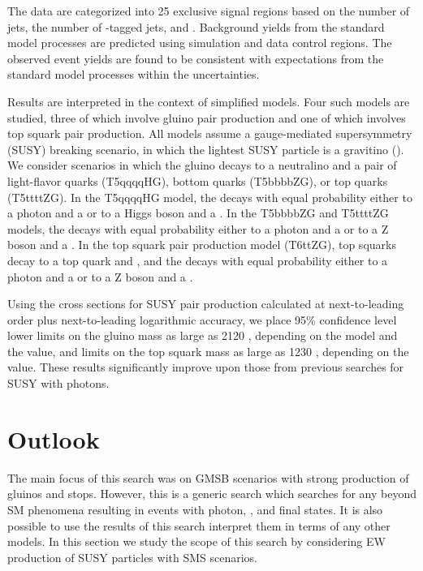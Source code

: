 The data are categorized into 25 exclusive signal regions based on the number of
jets, the number of {\cPqb}-tagged jets, and \ptmiss.  Background yields from the standard model
processes are predicted using simulation and data control regions.  The observed event
yields are found to be consistent with expectations from the standard model processes
within the uncertainties.

Results are interpreted in the context of simplified models.  Four such models
are studied, three of which involve gluino pair production
and one of which involves top squark pair production. All models assume
a gauge-mediated supersymmetry (SUSY) breaking scenario, in which the lightest SUSY particle is a gravitino (\PXXSG).
We consider scenarios in which the gluino decays to
a neutralino \PSGczDo and a pair of light-flavor quarks (T5qqqqHG),
bottom quarks (T5bbbbZG), or top quarks (T5ttttZG).
In the T5qqqqHG model, the \PSGczDo decays with equal probability either to a photon and a \PXXSG
or to a Higgs boson and a \PXXSG.  In the T5bbbbZG
and T5ttttZG models, the \PSGczDo decays with equal probability either to a photon and a \PXXSG or to a
Z boson and a \PXXSG.  In the top squark pair production model (T6ttZG),
top squarks decay to a top quark and \PSGczDo, and the \PSGczDo decays with equal probability either to a photon and a \PXXSG or to a Z boson and a \PXXSG.

Using the cross sections for SUSY pair production
calculated at next-to-leading order plus next-to-leading logarithmic accuracy, we place 95\% confidence level lower limits on
the gluino mass as large as 2120 \gev, depending on the model and the \mnlsp value, and
limits on the top squark mass as large as 1230 \gev, depending on the \mnlsp value.
These results significantly improve upon those from previous searches for SUSY with photons.

\section{Outlook}
\label{sec:outlook}
The main focus of this search was on GMSB scenarios with strong production of gluinos and stops.
However, this is a generic search which searches for any beyond SM phenomena resulting in events
with photon, \ptmiss, \nj and \nb final states. It is also possible to use the results of this search 
interpret them in terms of any other models. In this section we study the scope of this search by considering 
EW production of SUSY particles with SMS scenarios.
